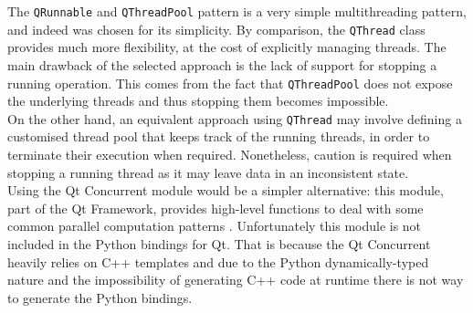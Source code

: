 The \texttt{QRunnable} and \texttt{QThreadPool} pattern is a very simple multithreading pattern, and indeed was chosen for its simplicity. By comparison, the \texttt{QThread} class provides much more flexibility, at the cost of explicitly managing threads. The main drawback of the selected approach is the lack of support for stopping a running operation. This comes from the fact that \texttt{QThreadPool} does not expose the underlying threads and thus stopping them becomes impossible.\\
On the other hand, an equivalent approach using \texttt{QThread} may involve defining a customised thread pool that keeps track of the running threads, in order to terminate their execution when required. Nonetheless, caution is required when stopping a running thread as it may leave data in an inconsistent state.\\
Using the Qt Concurrent module would be a simpler alternative: this module, part of the Qt Framework, provides high-level functions to deal with some common parallel computation patterns \cite{site:qt-concurrent}. Unfortunately this module is not included in the Python bindings for Qt. That is because the Qt Concurrent heavily relies on C++ templates and due to the Python dynamically-typed nature and the impossibility of generating C++ code at runtime there is not way to generate the Python bindings.


